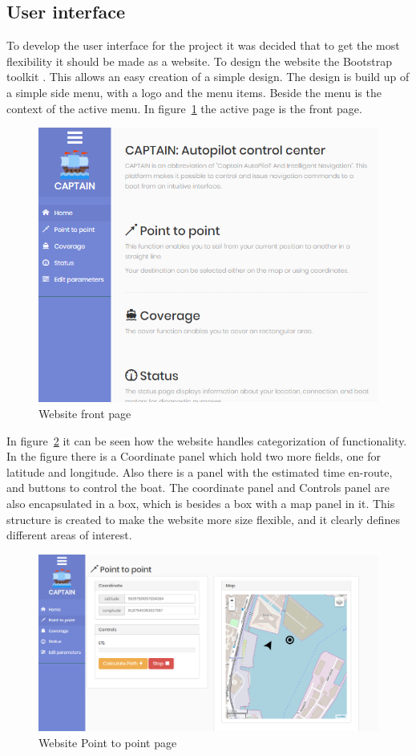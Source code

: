 \subsection{User interface}
To develop the user interface for the project it was decided that to get the most flexibility it should be made as a website. To design the website the Bootstrap toolkit \cite{bootstrap}. This allows an easy creation of a simple design.
The design is build up of a simple side menu, with a logo and the menu items. Beside the menu is the context of the active menu. In figure~\ref{fig:frontpage} the active page is the front page.

\begin{figure}[H]
\centering
\includegraphics[width=0.7\linewidth]{Images/Implementation/frontpage}
\caption{Website front page}
\label{fig:frontpage}
\end{figure}

In figure~\ref{fig:p2ppage} it can be seen how the website handles categorization of functionality. In the figure there is a Coordinate panel which hold two more fields, one for latitude and longitude. Also there is a panel with the estimated time en-route, and buttons to control the boat. The coordinate panel and Controls panel are also encapsulated in a box, which is besides a box with a map panel in it. This structure is created to make the website more size flexible, and it clearly defines different areas of interest.

\begin{figure}[H]
\centering
\includegraphics[width=0.9\linewidth]{Images/Implementation/p2p_page}
\caption{Website Point to point page}
\label{fig:p2ppage}
\end{figure}


